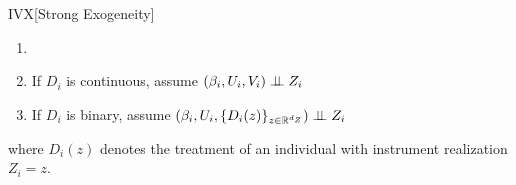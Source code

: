 \begin{assumptionp}{IVX}[Strong Exogeneity]\label{ass:exog}
    \begin{enumerate}[label={\emph{(\alph*)}}, ref={(\alph*)}]
       \item[]
       \item \label{ass:assump-exog-a}
       If \(D_i\) is continuous, assume \((\beta_i,U_i,V_i) \perp \!\!\! \perp Z_i\)
       \item \label{ass:assump-exog-b}
       If \(D_i\) is binary, assume \((\beta_i,U_i,\{D_i(z)\}_{z\in\mathbb{R}^{d_Z}} ) \perp \!\!\! \perp Z_i\)
\end{enumerate} \vspace{8pt}

\noindent
where \(D_i(z)\) denotes the treatment of an individual with instrument realization \(Z_i=z\).
\end{assumptionp}

